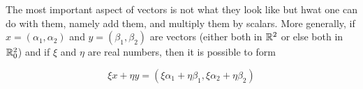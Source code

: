 The most important aspect of vectors is not what they look like but hwat one can do with them, namely add them, and multiply them by scalars. More generally, if $x = (\alpha_1, \alpha_2)$ and $y = (\beta_1, \beta_2)$ are vectors (either both in $\mathbb{R}^2$ or else both in $\mathbb{R}^2_0$) and if $\xi$ and $\eta$ are real numbers, then it is possible to form

\begin{equation}
    \xi x + \eta y = (\xi \alpha_1 + \eta \beta_1, \xi \alpha_2 + \eta \beta_2)
\end{equation}

